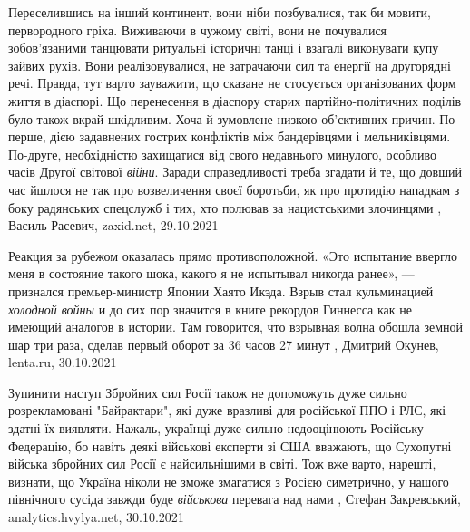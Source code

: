 Переселившись на інший континент, вони ніби позбувалися, так би мовити,
первородного гріха. Виживаючи в чужому світі, вони не почувалися зобов’язаними
танцювати ритуальні історичні танці і взагалі виконувати купу зайвих рухів.
Вони реалізовувалися, не затрачаючи сил та енергії на другорядні речі. Правда,
тут варто зауважити, що сказане не стосується організованих форм життя в
діаспорі. Що перенесення в діаспору старих партійно-політичних поділів було
також вкрай шкідливим. Хоча й зумовлене низкою об’єктивних причин. По-перше,
дією задавнених гострих конфліктів між бандерівцями і мельниківцями. По-друге,
необхідністю захищатися від свого недавнього минулого, особливо часів Другої
світової \emph{війни}. Заради справедливості треба згадати й те, що довший час йшлося
не так про возвеличення своєї боротьби, як про протидію нападкам з боку
радянських спецслужб і тих, хто полював за нацистськими злочинцями
, 
Василь Расевич, zaxid.net, 29.10.2021

Реакция за рубежом оказалась прямо противоположной. «Это испытание ввергло меня
в состояние такого шока, какого я не испытывал никогда ранее», — признался
премьер-министр Японии Хаято Икэда.  Взрыв стал кульминацией \emph{холодной
войны} и до сих пор значится в книге рекордов Гиннесса как не имеющий аналогов
в истории. Там говорится, что взрывная волна обошла земной шар три раза, сделав
первый оборот за 36 часов 27 минут
, Дмитрий Окунев, lenta.ru, 30.10.2021

Зупинити наступ Збройних сил Росії також не допоможуть дуже сильно
розрекламовані "Байрактари", які дуже вразливі для російської ППО і РЛС, які
здатні їх виявляти. Нажаль, українці дуже сильно недооцінюють Російську
Федерацію, бо навіть деякі військові експерти зі США вважають, що Сухопутні
війська збройних сил Росії є найсильнішими в світі. Тож вже варто, нарешті,
визнати, що Україна ніколи не зможе змагатися з Росією симетрично, у нашого
північного сусіда завжди буде \emph{військова} перевага над нами
, 
Стефан Закревський, analytics.hvylya.net, 30.10.2021



